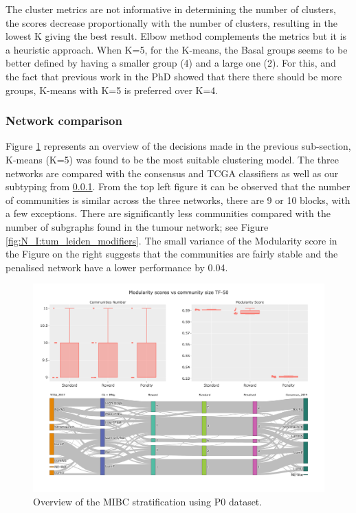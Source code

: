 {The cluster metrics are not informative in determining the number of clusters, the scores decrease proportionally with the number of clusters, resulting in the lowest K giving the best result. Elbow method complements the metrics but it is a heuristic approach. When K=5, for the K-means, the Basal groups seems to be better defined by having a smaller group (4) and a large one (2). For this, and the fact that previous work in the PhD showed that there there should be more groups, K-means with K=5 is preferred over K=4.

\subsubsection{Network comparison}


Figure \ref{fig:N_I:p0_sky_leiden} represents an overview of the decisions made in the previous sub-section, K-means (K=5) was found to be the most suitable clustering model. The three networks are compared with the consensus and TCGA classifiers \citet{Kamoun2020-tj, Robertson2017-mg} as well as our subtyping from \ref{}. From the top left figure it can be observed that the number of communities is similar across the three networks, there are 9 or 10 blocks, with a few exceptions. There are significantly less communities compared with the number of subgraphs found in the tumour network; see Figure \ref{fig:N_I:tum_leiden_modifiers}. The small variance of the Modularity score in the Figure on the right suggests that the communities are fairly stable and the penalised network have a lower performance by 0.04.

\begin{figure}[!t]    
    \centering
    \includegraphics[width=1.0\textwidth,height=0.7\textheight,keepaspectratio]{Sections/Network_I/Resources/P0/Ldn_Sky_TF_50_RawKMeans_K5_v3.png}
    \caption{Overview of the MIBC stratification using P0 dataset.}
    \label{fig:N_I:p0_sky_leiden}
\end{figure}

}
